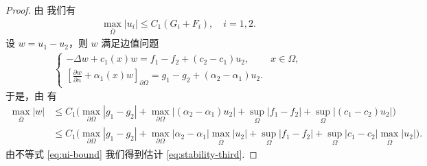 \documentclass[../../main.tex]{subfiles}%
\begin{document}
\begin{proof}
由 我们有
\begin{align}
\max_{\overline{\Omega}} |u_i| \leqslant C_1(G_i+F_i), \quad i=1,2. \label{eq:ui-bound}
\end{align}
设 $w=u_1-u_2$，则 $w$ 满足边值问题
\begin{align*}
\begin{cases}
-\Delta w + c_1(x)w = f_1-f_2 + (c_2-c_1)u_2, & x\in\Omega, \\
\left[\frac{\partial w}{\partial n} + \alpha_1(x)w\right]_{\partial\Omega} = g_1-g_2 + (\alpha_2-\alpha_1)u_2.
\end{cases}
\end{align*}
于是，由 有
\begin{align*}
\max_{\overline{\Omega}} |w| &\leqslant C_1\big(\max_{\partial\Omega}|g_1-g_2| + \max_{\partial\Omega}|(\alpha_2-\alpha_1)u_2| + \sup_{\Omega}|f_1-f_2| + \sup_{\Omega}|(c_1-c_2)u_2|\big) \\
&\leqslant C_1\big(\max_{\partial\Omega}|g_1-g_2| + \max_{\partial\Omega}|\alpha_2-\alpha_1|\max_{\overline{\Omega}}|u_2|
+ \sup_{\Omega}|f_1-f_2| + \sup_{\Omega}|c_1-c_2|\max_{\overline{\Omega}}|u_2|\big).
\end{align*}
由不等式 \eqref{eq:ui-bound} 我们得到估计 \eqref{eq:stability-third}.
\end{proof}
\end{document}
